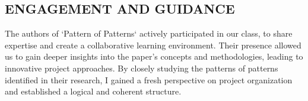 \subsection*{\normalsize{} ENGAGEMENT AND GUIDANCE{\hfill \motor}}
The authors of ‘Pattern of Patterns‘ actively participated in our
class, to share expertise and create a collaborative learning
environment. Their presence allowed us to gain deeper insights into
the paper's concepts and methodologies, leading to innovative project
approaches. By closely studying the patterns of patterns identified in
their research, I gained a fresh perspective on project organization
and established a logical and coherent structure.

